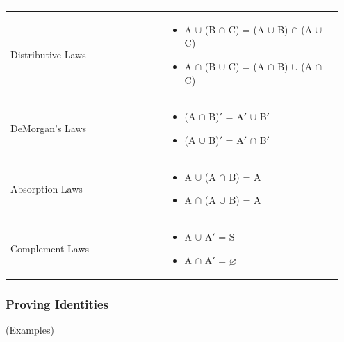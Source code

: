 \documentclass[12pt, letterpaper]{article}
\begin{document}
\begin{tabular}{ |p{0.45\linewidth}|p{0.5\linewidth}|}
\begin{itemize}[leftmargin=*, label={}]
	\end{itemize} \\ \hline
	\smallbreak Distributive Laws & \begin{itemize}[leftmargin=*, label={}]
		\item A $\cup$ (B $\cap$ C) = (A $\cup$ B) $\cap$ (A $\cup$ C)
		\item A $\cap$ (B $\cup$ C) = (A $\cap$ B) $\cup$ (A $\cap$ C) \vspace*{-0.3cm}
	\end{itemize} \\ \hline
	\smallbreak DeMorgan's Laws & \begin{itemize}[leftmargin=*, label={}]
		\item (A $\cap$ B)$'$ = A$'$ $\cup$ B$'$
		\item (A $\cup$ B)$'$ = A$'$ $\cap$ B$'$ \vspace*{-0.3cm}
	\end{itemize} \\ \hline
	\smallbreak Absorption Laws & \begin{itemize}[leftmargin=*, label={}]
		\item A $\cup$ (A $\cap$ B) = A
		\item A $\cap$ (A $\cup$ B) = A \vspace*{-0.3cm}
	\end{itemize} \\ \hline
	\smallbreak Complement Laws & \begin{itemize}[leftmargin=*, label={}]
		\item A $\cup$ A$'$ = S 
		\item A $\cap$ A$'$ = $\varnothing$ \vspace*{-0.3cm}
	\end{itemize} \\ \hline
\end{tabular}


\pagebreak

\subsubsection{Proving Identities}
\vspace*{-0.3cm}
{\small (Examples)} \\
\smallbreak
\end{document}
